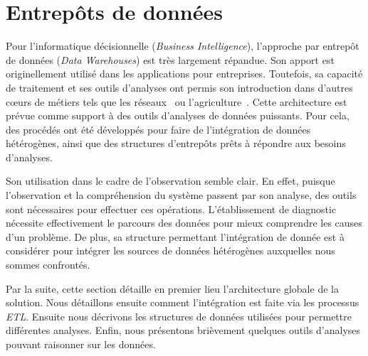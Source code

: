 \section{Entrepôts de données}\label{sec:rw:supervision:warehouse}
Pour l'informatique décisionnelle (\textit{Business Intelligence}), l'approche par entrepôt de données (\textit{Data Warehouses}) est très largement répandue. Son apport est originellement utilisé dans les applications pour entreprises. Toutefois, sa capacité de traitement et ses outils d'analyses ont permis son introduction dans d'autres cœurs de métiers tels que les réseaux~\cite{Gilbert:quicksand} ou l'agriculture~\cite{Abdullah:olap}. Cette architecture est prévue comme support à des outils d'analyses de données puissants. Pour cela, des procédés ont été développés pour faire de l'intégration de données hétérogènes, ainsi que des structures d'entrepôts prêts à répondre aux besoins d'analyses.

Son utilisation dans le cadre de l'observation semble clair. En effet, puisque l'observation et la compréhension du système passent par son analyse, des outils sont nécessaires pour effectuer ces opérations. L'établissement de diagnostic nécessite effectivement le parcours des données pour mieux comprendre les causes d'un problème. De plus, sa structure permettant l'intégration de donnée est à considérer pour intégrer les sources de données hétérogènes auxquelles nous sommes confrontés.

Par la suite, cette section détaille en premier lieu l'architecture globale de la solution. Nous détaillons ensuite comment l'intégration est faite via les processus \textit{ETL}. Ensuite nous décrivons les structures de données utilisées pour permettre différentes analyses. Enfin, nous présentons brièvement quelques outils d'analyses pouvant raisonner sur les données.

